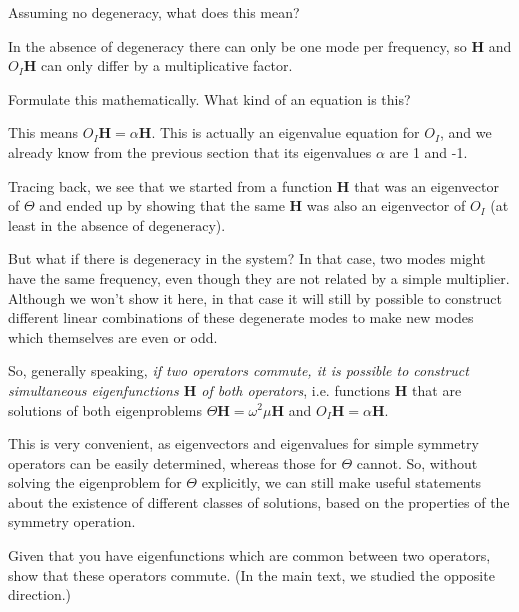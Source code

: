 \begin{cue}
Assuming no degeneracy, what does this mean?
\end{cue}

In the absence of degeneracy there can only be one mode per frequency, so ${\mathbf H}$ and $O_I {\mathbf H}$ can only differ by a multiplicative factor.

\begin{cue}
Formulate this mathematically. What kind of an equation is this?
\end{cue}

This means $O_I {\mathbf H} = \alpha {\mathbf H}$. This is actually an eigenvalue equation for $O_I$, and we already know from the previous section that its eigenvalues $\alpha$ are 1 and -1. 

Tracing back, we see that we started from a function ${\mathbf H}$ that was an eigenvector of $\Theta$ and ended up by showing that the same ${\mathbf H}$ was also an eigenvector of $O_I$ (at least in the absence of degeneracy). 

But what if there is degeneracy in the system? In that case, two modes might have the same frequency, even though they are not related by a simple multiplier. Although we won't show it here, in that case it will still by possible to construct different linear combinations of these degenerate modes to make new modes which themselves are even or odd.

So, generally speaking, \emph{if two operators commute, it is possible to construct simultaneous eigenfunctions ${\mathbf H}$ of both operators}, i.e. functions ${\mathbf H}$ that are solutions of both eigenproblems $\Theta {\mathbf H} = \omega^2 \mu {\mathbf H}$ and $O_I {\mathbf H} = \alpha {\mathbf H}$.

This is very convenient, as eigenvectors and eigenvalues for simple symmetry operators can be easily determined, whereas those for $\Theta$ cannot. So, without solving the eigenproblem for $\Theta$ explicitly, we can still make useful statements about the existence of different classes of solutions, based on the properties of the symmetry operation.

\begin{exer}
Given that you have eigenfunctions which are common between two operators, show that these operators commute. (In the main text, we studied the opposite direction.)  
\end{exer}

\begin{exer}
What is the commutator of $x$ and $d/dx$?}  
\end{exer}

